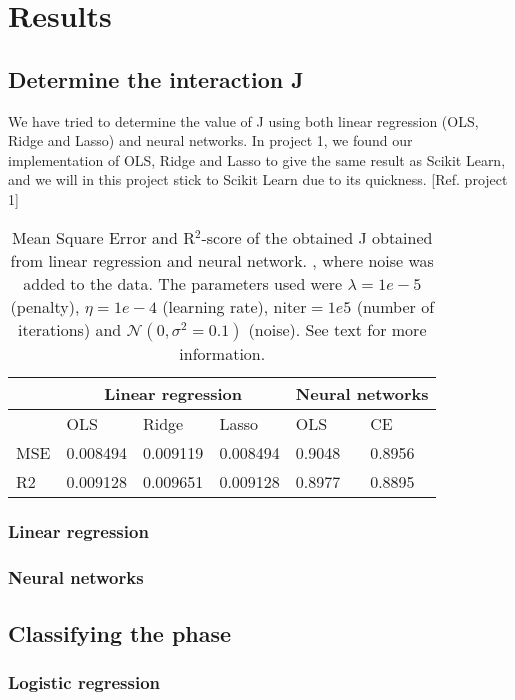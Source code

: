 \section{Results} \label{sec:results}

\subsection{Determine the interaction J}
We have tried to determine the value of J using both linear regression (OLS, Ridge and Lasso) and neural networks. In project 1, we found our implementation of OLS, Ridge and Lasso to give the same result as Scikit Learn, and we will in this project stick to Scikit Learn due to its quickness. [Ref. project 1]
\begin{table} [H]
	\caption{Mean Square Error and R$^2$-score of the obtained J obtained from linear regression and neural network.  , where noise was added to the data. The parameters used were $\lambda=1e-5$ (penalty), $\eta=1e-4$ (learning rate), $\text{niter}=1e5$ (number of iterations) and $\mathcal{N}(0, \sigma^2=0.1)$ (noise). See text for more information.}
	\begin{tabularx}{\textwidth}{l|XXX|XX} \hline\hline
		\label{tab:franke_error}
		& \multicolumn{3}{c}{\textbf{Linear regression}}&\multicolumn{2}{c}{\textbf{Neural networks}}\\ \hline
		&OLS&Ridge&Lasso&OLS&CE\\ \hline
		MSE & 0.008494 & 0.009119 & 0.008494 & 0.9048 & 0.8956 \\
		R2 & 0.009128 & 0.009651 & 0.009128 & 0.8977 & 0.8895 \\ \hline
	\end{tabularx}
\end{table}

\subsubsection{Linear regression}
\subsubsection{Neural networks}

\subsection{Classifying the phase}
\subsubsection{Logistic regression}
